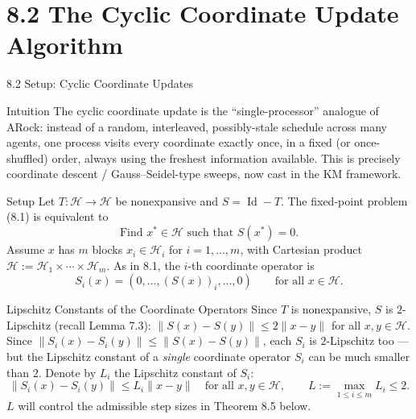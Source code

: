 \documentclass[aspectratio=169,10pt]{beamer}
\newcommand{\Hsp}{\mathcal H}
\newcommand{\Id}{\operatorname{Id}}
\newcommand{\norm}[1]{\lVert #1 \rVert}
\begin{document}
\section{8.2 The Cyclic Coordinate Update Algorithm}

\begin{frame}[allowframebreaks]{8.2 Setup: Cyclic Coordinate Updates}

\begin{alertblock}{Intuition}
The cyclic coordinate update is the ``single-processor'' analogue of ARock: instead of a random, interleaved, possibly-stale schedule across many agents, one process visits every coordinate exactly once, in a fixed (or once-shuffled) order, always using the freshest information available. This is precisely coordinate descent / Gauss--Seidel-type sweeps, now cast in the KM framework.
\end{alertblock}

\begin{block}{Setup}
Let $T:\Hsp\to\Hsp$ be nonexpansive and $S=\Id-T$. The fixed-point problem (8.1) is equivalent to
\[
  \text{Find } x^*\in\Hsp \text{ such that } S(x^*)=0. \tag{8.6}
\]
Assume $x$ has $m$ blocks $x_i\in\Hsp_i$ for $i=1,\ldots,m$, with Cartesian product $\Hsp:=\Hsp_1\times\cdots\times\Hsp_m$. As in 8.1, the $i$-th coordinate operator is
\[
  S_i(x) = (0,\ldots,(S(x))_i,\ldots,0) \qquad \text{for all } x\in\Hsp.
\]
\end{block}

\begin{block}{Lipschitz Constants of the Coordinate Operators}
Since $T$ is nonexpansive, $S$ is $2$-Lipschitz (recall Lemma 7.3): $\norm{S(x)-S(y)}\le 2\norm{x-y}$ for all $x,y\in\Hsp$. Since $\norm{S_i(x)-S_i(y)}\le\norm{S(x)-S(y)}$, each $S_i$ is $2$-Lipschitz too --- but the Lipschitz constant of a \emph{single} coordinate operator $S_i$ can be much smaller than $2$. Denote by $L_i$ the Lipschitz constant of $S_i$:
\[
  \norm{S_i(x)-S_i(y)} \le L_i\norm{x-y} \quad \text{for all } x,y\in\Hsp, \qquad L:=\max_{1\le i\le m}L_i \le 2.
\]
$L$ will control the admissible step sizes in Theorem 8.5 below.
\end{block}

\end{frame}
\end{document}
